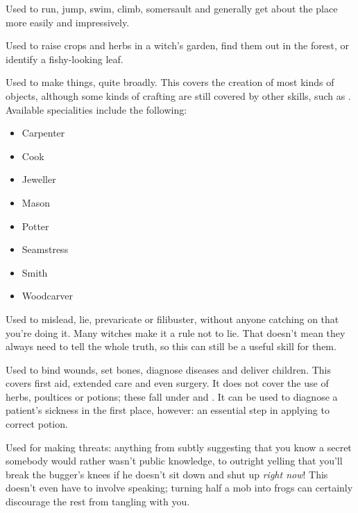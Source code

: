 
Used to run, jump, swim, climb, somersault and generally get about the place more easily and impressively.


Used to raise crops and herbs in a witch's garden, find them out in the forest, or identify a fishy-looking leaf.


Used to make things, quite broadly.
This covers the creation of most kinds of objects, although some kinds of crafting are still covered by other skills, such as .
Available specialities include the following:

\begin{itemize}
	\item Carpenter
	\item Cook
	\item Jeweller
	\item Mason
	\item Potter
	\item Seamstress
	\item Smith
	\item Woodcarver
\end{itemize}


Used to mislead, lie, prevaricate or filibuster, without anyone catching on that you're doing it.
Many witches make it a rule not to lie.
That doesn't mean they always need to tell the whole truth, so this can still be a useful skill for them.


Used to bind wounds, set bones, diagnose diseases and deliver children.
This covers first aid, extended care and even surgery.
It does not cover the use of herbs, poultices or potions; these fall under  and .
It can be used to diagnose a patient's sickness in the first place, however: an essential step in applying to correct potion.


Used for making threats: anything from subtly suggesting that you know a secret somebody would rather wasn't public knowledge, to outright yelling that you'll break the bugger's knees if he doesn't sit down and shut up \emph{right now}!
This doesn't even have to involve speaking; turning half a mob into frogs can certainly discourage the rest from tangling with you.

